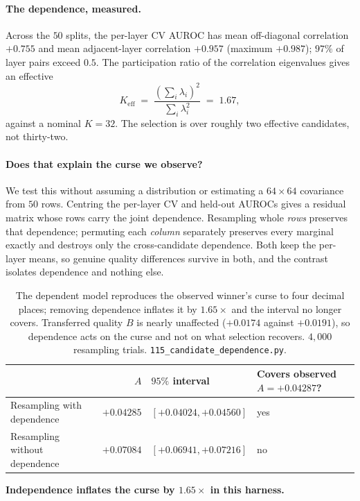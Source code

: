 \documentclass{article}
\begin{document}
\paragraph{The dependence, measured.} Across the $50$ splits, the per-layer CV
AUROC has mean off-diagonal correlation $+0.755$ and mean adjacent-layer
correlation $+0.957$ (maximum $+0.987$); $97\%$ of layer pairs exceed $0.5$.
The participation ratio of the correlation eigenvalues gives an effective
\[
  K_{\text{eff}} \;=\; \frac{(\sum_i \lambda_i)^2}{\sum_i \lambda_i^2}
  \;=\; 1.67 ,
\]
against a nominal $K=32$. The selection is over roughly two effective
candidates, not thirty-two.

\paragraph{Does that explain the curse we observe?} We test this without
assuming a distribution or estimating a $64\times64$ covariance from $50$
rows. Centring the per-layer CV and held-out AUROCs gives a residual matrix
whose rows carry the joint dependence. Resampling whole \emph{rows} preserves
that dependence; permuting each \emph{column} separately preserves every
marginal exactly and destroys only the cross-candidate dependence. Both keep
the per-layer means, so genuine quality differences survive in both, and the
contrast isolates dependence and nothing else.

\begin{table}[h]
\centering
\small
\begin{tabular}{@{}lrll@{}}
\toprule
& $A$ & $95\%$ interval & Covers observed $A=+0.04287$? \\
\midrule
Resampling with dependence & $+0.04285$ & $[+0.04024,+0.04560]$ & yes \\
Resampling without dependence & $+0.07084$ & $[+0.06941,+0.07216]$ & no \\
\bottomrule
\end{tabular}
\caption{The dependent model reproduces the observed winner's curse to four
decimal places; removing dependence inflates it by $1.65\times$ and the
interval no longer covers. Transferred quality $B$ is nearly unaffected
($+0.0174$ against $+0.0191$), so dependence acts on the curse and not on what
selection recovers. $4{,}000$ resampling trials.
\texttt{115\_candidate\_dependence.py}.}
\label{tab:dependence}
\end{table}

\textbf{Independence inflates the curse by $1.65\times$ in this harness.}
\end{document}
